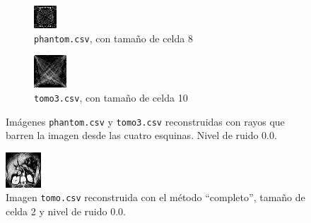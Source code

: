 \documentclass[a4paper]{article}
\begin{document}
\begin{figure}
\centering
\begin{subfigure}{0.4\textwidth}
  \centering
  \includegraphics[width=0.6\linewidth]{rayos/phantom-barrido}
  \caption{\texttt{phantom.csv}, con tamaño de celda 8}
\end{subfigure}%
\begin{subfigure}{0.4\textwidth}
  \centering
  \includegraphics[width=0.6\linewidth]{rayos/tomo3-barrido}
  \caption{\texttt{tomo3.csv}, con tamaño de celda 10}
\end{subfigure}
\caption{Imágenes \texttt{phantom.csv} y \texttt{tomo3.csv} reconstruidas con rayos que barren la imagen desde las cuatro esquinas. Nivel de 
ruido 0.0.}
\label{fig:muestras_barrido}
\end{figure}


\begin{figure}
\centering
\includegraphics[width=0.3\linewidth]{rayos/tomo-completo}
\caption{Imagen \texttt{tomo.csv} reconstruida con el método ``completo'', tamaño de celda 2 y nivel de ruido 0.0.}
\label{fig:muestra_completo}
\end{figure}
\end{document}
